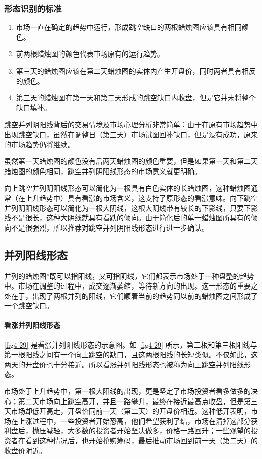\subsubsection*{形态识别的标准}
\begin{enumerate}
    \item 市场一直在确定的趋势中运行，形成跳空缺口的两根蜡烛图应该具有相同颜色。
    \item 前两根蜡烛图的颜色代表市场原有的运行趋势。
    \item 第三天的蜡烛图应该在第二天蜡烛图的实体内产生开盘价，同时两者具有相反的颜色。
    \item 第三天的蜡烛图在第一天和第二天形成的跳空缺口内收盘，但是它并未将整个缺口填补。
\end{enumerate}

跳空并列阴阳线背后的交易情境及市场心理分析非常简单：由于在原有市场趋势中出现跳空缺口，虽然在调整日（第三天）市场试图回补缺口，但是没有成功，原来的市场趋势仍将继续。

虽然第一天蜡烛图的颜色没有后两天蜡烛图的颜色重要，但是如果第一天和第二天蜡烛图的颜色相同，跳空并列阴阳线形态的市场意义就更明确。

向上跳空并列阴阳线形态可以简化为一根具有白色实体的长蜡烛图，这种蜡烛图通常（在上升趋势中）具有看涨的市场含义，这支持了原形态的看涨意味。向下跳空并列阴阳线形态可以简化为一根大阴线，这根大阴线带有较长的下影线，只要下影线不是很长，这种大阴线就具有看跌的倾向。由于简化后的单一蜡烛图所具有的倾向不是很强烈，所以推荐对跳空并列阴阳线形态进行进一步确认。
\subsection{并列阳线形态}
并列的蜡烛图”既可以指阳线，又可指阴线，它们都表示市场处于一种盘整的趋势中。市场在调整的过程中，成交逐渐萎缩，等待新方向的出现。这一形态的重要之处在于，出现了两根并列的阳线，它们顺着当前的趋势同以前的蜡烛图之间形成了一个跳空缺口。

\paragraph{看涨并列阳线形态} \autoref{fig4-29} 是看涨并列阳线形态的示意图。如 \autoref{fig4-29} 所示，第二根和第三根阳线与第一根阳线之间有一个向上跳空的缺口，且这两根阳线的长短类似。不仅如此，这两天的开盘价也十分接近。所以看涨并列阳线形态也被称为向上跳空并列阳线形态。

市场处于上升趋势中，第一根大阳线的出现，更是坚定了市场投资者看多做多的决心；第二天市场向上跳空高开，并且一路攀升，最终在接近最高点收盘，但是第三天市场却低开高走，开盘价同前一天（第二天）的开盘价相近。这种低开表明，市场在上涨过程中，一些投资者开始恐高，他们希望获利了结，市场在清掉这部分获利盘后，抛压减轻，大多数的投资者开始坚决做多，价格一路回升；一些观望的投资者在看到这种情况后，也开始抢购筹码，最后推动市场回到前一天（第二天）的收盘价附近。

